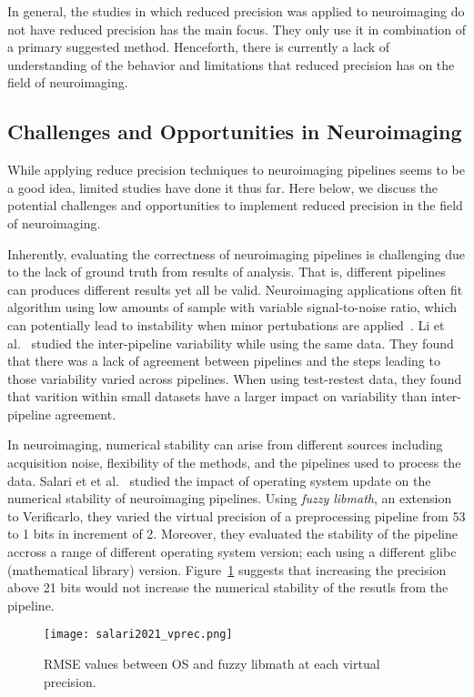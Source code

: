In general, the studies in which reduced precision was applied to neuroimaging 
do not have reduced precision has the main focus.
They only use it in combination of a primary suggested method.
Henceforth, there is currently a lack of understanding of the behavior and limitations
that reduced precision has on the field of neuroimaging.

\subsection{Challenges and Opportunities in Neuroimaging}
While applying reduce precision techniques to neuroimaging pipelines seems to be a
good idea, limited studies have done it thus far.
Here below, we discuss the potential challenges and opportunities to implement
reduced precision in the field of neuroimaging.

Inherently, evaluating the correctness of neuroimaging pipelines is challenging due
to the lack of ground truth from results of analysis.
That is, different pipelines can produces different results yet all be valid.
Neuroimaging applications often fit algorithm using low amounts of sample with variable
signal-to-noise ratio, which can potentially lead to instability when minor pertubations are applied~\cite{Kiar2020-uv}.
Li et al.~\cite{Li2021-om} studied the inter-pipeline variability while using the same data.
They found that there was a lack of agreement between pipelines and the steps leading
to those variability varied across pipelines.
When using test-restest data, they found that varition within small datasets have 
a larger impact on variability than inter-pipeline agreement.

In neuroimaging, numerical stability can arise from different sources including
acquisition noise, flexibility of the methods, and the pipelines used to process the data.
Salari et et al.~\cite{Salari2021-kd} studied the impact of operating system update on
the numerical stability of neuroimaging pipelines.
Using \textit{fuzzy libmath}, an extension to Verificarlo, they varied the virtual
precision of a preprocessing pipeline from 53 to 1 bits in increment of 2.
Moreover, they evaluated the stability of the pipeline accross a range of different 
operating system version; each using a different glibc (mathematical library) version.
Figure~\ref{fig:salari2021_vprec} suggests that increasing the precision above 21 bits
would not increase the numerical stability of the resutls from the pipeline.
\begin{figure}[h]
	\centering
	\texttt{[image: salari2021\_vprec.png]}
	\caption{RMSE values between OS and fuzzy libmath at each virtual precision.}
	\label{fig:salari2021_vprec}
\end{figure}

